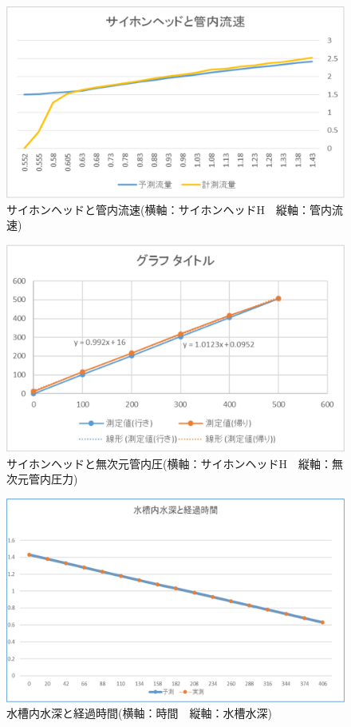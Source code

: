 \documentclass[a4j,twoside,openright,11pt]{jarticle}
\begin{document}
\begin{figure}[htbp]
\begin{center}
\includegraphics[width=12cm]{4.eps}
\end{center}
\caption{サイホンヘッドと管内流速(横軸：サイホンヘッドH　縦軸：管内流速)}
\end{figure}

\begin{figure}[htbp]
\begin{center}
\includegraphics[width=12cm]{1.eps}
\end{center}
\caption{サイホンヘッドと無次元管内圧(横軸：サイホンヘッドH　縦軸：無次元管内圧力)}
\end{figure}

\begin{figure}[htbp]
\begin{center}
\includegraphics[width=12cm]{2.eps}
\end{center}
\caption{水槽内水深と経過時間(横軸：時間　縦軸：水槽水深)}
\end{figure}
\end{document}

